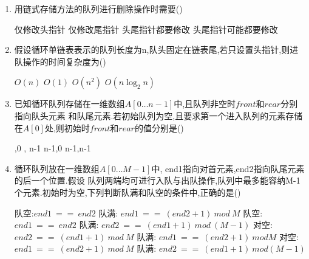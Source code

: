 \documentclass[12pt, a4paper, oneside, UTF8]{ctexbook}
\begin{document}
\begin{enumerate}


    \item 用链式存储方法的队列进行删除操作时需要() 
    \begin{choices}[2]
        \task 仅修改头指针
        \task 仅修改尾指针
        \task 头尾指针都要修改
        \task 头尾指针可能都要修改 
    \end{choices}


    \item 假设循环单链表表示的队列长度为n,队头固定在链表尾,若只设置头指针,则进队操作的时间复杂度为() 
    \begin{choices}
        \task $O(n) $ \task $O(1)$ \task $O(n^2)$ \task $O(n\log_{2}{n})$
    \end{choices}

    \item \bl 已知循环队列存储在一维数组$A[0\ldots n-1]$中,且队列非空时$front$和$rear$分别指向队头元素
    和队尾元素.若初始队列为空,且要求第一个进入队列的元素存储在$A[0]$处,则初始时$front$和$rear$的值分别是() 
    \begin{choices}
        ,0 , n-1 \task n-1,0 \task n-1,n-1
    \end{choices}

    \item 循环队列放在一维数组$A[0\ldots M-1]$中, end1指向对首元素,end2指向队尾元素的后一个位置.假设
    队列两端均可进行入队与出队操作,队列中最多能容纳M-1个元素.初始时为空,下列判断队满和队空的条件中,正确的是() 
    \begin{choices}[1]
        \task 队空:$end1\ ==\ end2$ 队满: $end1\ ==\ (end2+1)\ mod\ M$ 
        \task 队空:$end1\ ==\ end2$ 队满: $end2\ ==\ (end1+1)\ mod\ (M-1)$
        \task 对空:$end2\ ==\ (end1+1)\ mod\ M$ 队满: $end1\ ==\ (end2+1)\ mod M$
        \task 对空:$end1\ ==\ (end2+1)\ mod\ M$ 队满: $end2\ ==\ (end1+1)\ mod (M-1)$
    \end{choices}


\end{enumerate}
\end{document}

